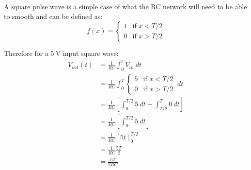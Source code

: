 \documentclass[11pt]{article}
\begin{document}
A square pulse wave is a simple case of what the RC network will need to be able to smooth and can be defined as:
\begin{equation}
  f(x) =
  \begin{cases}
      1 & \text{if } x<T/2 \\
      0 & \text{if } x>T/2
  \end{cases}
\end{equation}

Therefore for a $\SI{5}{\volt}$ input square wave:
\begingroup
\allowdisplaybreaks
\begin{subequations}
  \begin{align}
    V_{out}(t) &= \frac{1}{RC} \int_0^t V_{in}~dt \\
    &= \frac{1}{RC} \int_0^T \begin{cases}
        5 & \text{if } x<T/2 \\
        0 & \text{if } x>T/2
    \end{cases}~dt
    \\
    &= \frac{1}{RC}\left[\int_0^{T/2} 5 ~dt + \int_{T/2}^T 0 ~dt \right] \\
    &= \frac{1}{RC}\left[\int_0^{T/2} 5 ~dt \right] \\
    &= \frac{1}{RC}\left[5t \right]^{T/2}_0 \\
    &= \frac{1}{RC}\frac{5T}{2} \\
    &= \frac{5T}{2RC}
  \end{align}
\end{subequations}
\endgroup
\end{document}
